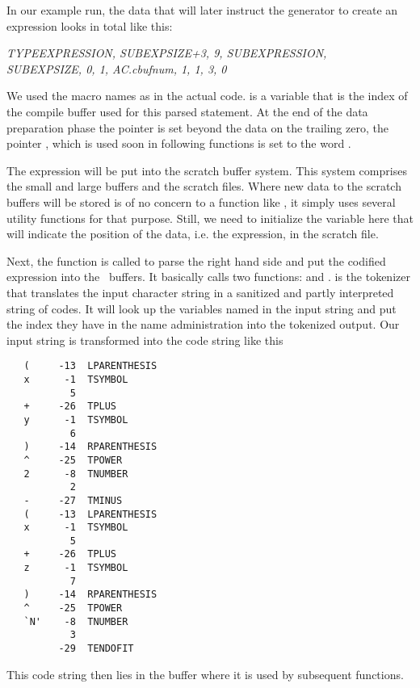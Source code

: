 	In our example run, the data that will later instruct the generator to 
create an expression looks in total like this:

\begin{center}
{\it TYPEEXPRESSION, SUBEXPSIZE+3, 9, SUBEXPRESSION, \\
SUBEXPSIZE, 0, 1, AC.cbufnum, 1, 1, 3, 0}
\end{center}

We used the macro names as in the actual code.  is a variable that
is the index of the compile buffer used for this parsed statement.
At the end of the data preparation phase the pointer  is set
beyond the data on the trailing zero, the pointer , which is
used soon in following functions is set to the word .

The expression will be put into the scratch buffer system. This system comprises
the small and large buffers and the scratch files. Where new data to the scratch
buffers will be stored is of no concern to a function like , it
simply uses several utility functions for that purpose. Still, we need to
initialize the variable  here that will indicate the position of the
data, i.e. the expression, in the scratch file.

Next, the function  is called to parse the right hand side
and put the codified expression into the \FORM\ buffers. It basically calls two
functions:  and .  is the
tokenizer that translates the input character string in a sanitized and partly
interpreted string of codes. It will look up the variables named in the input
string and put the index they have in the name administration into the tokenized
output. Our input string is transformed into the code string like this

\begin{verbatim}
   (     -13  LPARENTHESIS
   x      -1  TSYMBOL
           5
   +     -26  TPLUS
   y      -1  TSYMBOL
           6
   )     -14  RPARENTHESIS
   ^     -25  TPOWER
   2      -8  TNUMBER
           2
   -     -27  TMINUS
   (     -13  LPARENTHESIS
   x      -1  TSYMBOL
           5
   +     -26  TPLUS
   z      -1  TSYMBOL
           7
   )     -14  RPARENTHESIS
   ^     -25  TPOWER
   `N'    -8  TNUMBER
           3
         -29  TENDOFIT
\end{verbatim}

This code string then lies in the  buffer where it is used by
subsequent functions.

